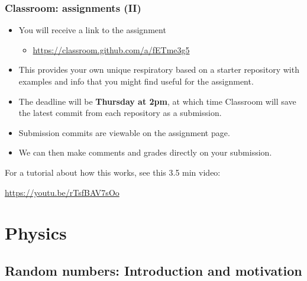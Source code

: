 \documentclass[hyperref={colorlinks=true}]{beamer}
\begin{document}
\begin{frame}%
  \frametitle{\github Classroom: assignments (II)}
  
  \begin{itemize}
    \item You will receive a link to the assignment
    \begin{itemize}
      \item \url{https://classroom.github.com/a/fETme3g5}
    \end{itemize}
    \item This provides your own unique respiratory based on a starter repository with examples and info that you might find useful for the assignment. 
    \item The deadline will be \textbf{Thursday at 2pm}, at which time \github Classroom will save the latest commit from each repository as a submission. 
    \item Submission commits are viewable  on the assignment page. 
    \item We can then make comments and grades directly on your submission.
  \end{itemize}
  
  For a tutorial about how this works, see this 3.5 min video:

  \centering \url{https://youtu.be/rTsfBAV7sOo}

\end{frame}

\section[Physics]{Physics}

\subsection[Random numbers: Introduction and motivation]{Random numbers: Introduction and motivation}
\end{document}
